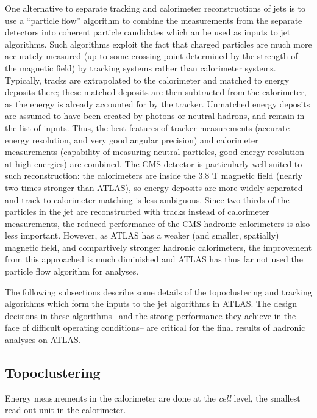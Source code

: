 One alternative to separate tracking and calorimeter reconstructions of jets is to use a ``particle flow'' algorithm to combine the measurements from the separate detectors into coherent particle candidates which an be used as inputs to jet algorithms. Such algorithms exploit the fact that charged particles are much more accurately measured (up to some crossing point determined by the strength of the magnetic field) by tracking systems rather than calorimeter systems. Typically, tracks are extrapolated to the calorimeter and matched to energy deposits there; these matched deposits are then subtracted from the calorimeter, as the energy is already accounted for by the tracker. Unmatched energy deposits are assumed to have been created by photons or neutral hadrons, and remain in the list of inputs. Thus, the best features of tracker measurements (accurate energy resolution, and very good angular precision) and calorimeter measurements (capability of measuring neutral particles, good energy resolution at high energies) are combined. The CMS detector is particularly well suited to such reconstruction: the calorimeters are inside the 3.8 T magnetic field (nearly two times stronger than ATLAS), so energy deposits are more widely separated and track-to-calorimeter matching is less ambiguous. Since two thirds of the particles in the jet are reconstructed with tracks instead of calorimeter measurements, the reduced performance of the CMS hadronic calorimeters is also less important. However, as ATLAS has a weaker (and smaller, spatially) magnetic field, and compartively stronger hadronic calorimeters, the improvement from this approached is much diminished and ATLAS has thus far not used the particle flow algorithm for analyses. 

The following subsections describe some details of the topoclustering and tracking algorithms which form the inputs to the jet algorithms in ATLAS. The design decisions in these algorithms-- and the strong performance they achieve in the face of difficult operating conditions-- are critical for the final results of hadronic analyses on ATLAS.

\subsection{Topoclustering}
\label{jet-reconstruction:jet-inputs:topoclustering}

Energy measurements in the calorimeter are done at the \textit{cell} level, the smallest read-out unit in the calorimeter.


